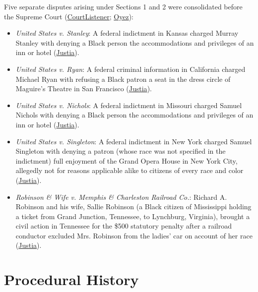 \documentclass[12pt]{article}
\begin{document}
Five separate disputes arising under Sections 1 and 2 were consolidated before the Supreme Court (\href{https://www.courtlistener.com/opinion/90897/civil-rights-cases/}{CourtListener}; \href{https://www.oyez.org/cases/1850-1900/109us3}{Oyez}):
\begin{itemize}
\item \textit{United States v. Stanley}: A federal indictment in Kansas charged Murray Stanley with denying a Black person the accommodations and privileges of an inn or hotel (\href{https://supreme.justia.com/cases/federal/us/109/3/}{Justia}).
\item \textit{United States v. Ryan}: A federal criminal information in California charged Michael Ryan with refusing a Black patron a seat in the dress circle of Maguire's Theatre in San Francisco (\href{https://supreme.justia.com/cases/federal/us/109/3/}{Justia}).
\item \textit{United States v. Nichols}: A federal indictment in Missouri charged Samuel Nichols with denying a Black person the accommodations and privileges of an inn or hotel (\href{https://supreme.justia.com/cases/federal/us/109/3/}{Justia}).
\item \textit{United States v. Singleton}: A federal indictment in New York charged Samuel Singleton with denying a patron (whose race was not specified in the indictment) full enjoyment of the Grand Opera House in New York City, allegedly not for reasons applicable alike to citizens of every race and color (\href{https://supreme.justia.com/cases/federal/us/109/3/}{Justia}).
\item \textit{Robinson \& Wife v. Memphis \& Charleston Railroad Co.}: Richard A. Robinson and his wife, Sallie Robinson (a Black citizen of Mississippi holding a ticket from Grand Junction, Tennessee, to Lynchburg, Virginia), brought a civil action in Tennessee for the \$500 statutory penalty after a railroad conductor excluded Mrs. Robinson from the ladies' car on account of her race (\href{https://supreme.justia.com/cases/federal/us/109/3/}{Justia}).
\end{itemize}

\section{Procedural History}
\end{document}
